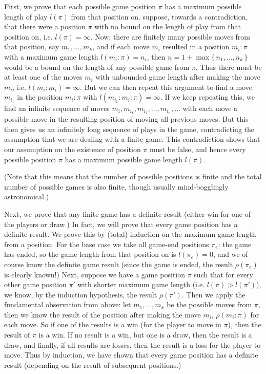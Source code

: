 \documentclass[10pt,dvipdfmx,letterpaper]{report}
\begin{document}
First, we prove that each possible game position $\pi$ has a maximum
possible length of play $l(\pi)$ from that position on.
suppose, towards a contradiction, that there were a position $\pi$ with no bound on the length
of play from that position on, {i.e.} $l(\pi)=\infty$.  Now, there are finitely many possible moves
from that position, say $m_1, \dots, m_k$, and if each move $m_i$ resulted
in a position $m_i:\pi$ with a maximum game length $l(m_i:\pi)=n_i$,
then $n=1+\max\{\,n_1,\dots,n_k\,\}$ would be a bound on the length of
any possible game from $\pi$.  Thus there must be at least one of the 
moves $m_i$ with unbounded game length after making the move $m_i$,
{i.e.} $l(m_i:m_i) = \infty$.
But we can then repeat this argument to find a move $m_{i_1}$ in the
position $m_i:\pi$ with $l(m_{i_1}:m_i:\pi)=\infty$.  If we keep repeating
this, we find an infinite sequence of moves
$m_i, m_{i_1}, m_{i_2}, \dots, m_{i_n}, \dots$ 
with each move a possible move in the resulting position of moving
all previous moves.  But this then gives us an infinitely long sequence of
plays in the game, contradicting the assumption that we are dealing with a finite game.
This contradiction shows that our assumption on the existence of position $\pi$ must be false,
and hence every possible position $\pi$ has a maximum possible game length $l(\pi)$.

(Note that this means that the number of possible
positions is finite and the total number of possible games is also finite, though
usually mind-bogglingly astronomical.)

Next, we prove that any finite game has a definite result
(either win for one of the players or draw.)  In fact, we will prove that every game
position has a definite result.  We prove this by (total) induction on the maximum game
length from a position.  For the base case we take all game-end positions $\pi_{e}$:
the game has ended, so the game length from that position on is $l(\pi_e)=0$, and we of course
know the definite game result (since the game is ended, the result $\rho(\pi_e)$ is clearly known!)
Next, suppose we have a game position $\pi$ such that for every other game position $\pi'$
with shorter maximum game length ({i.e.} $l(\pi)>l(\pi')$),
we know, by the induction hypothesis, the result $\rho(\pi')$.  Then we apply the fundamental
observation from above: let $m_1, \dots, m_k$ be the possible moves from $\pi$, then
we know the result of the position after making the move $m_i$, $\rho(m_i:\pi)$ for each move.
So if one of the results is a win (for the player to move in $\pi$), then the result of
$\pi$ is a win.  If no result is a win, but one is a draw, then the result is a draw,
and finally, if all results are losses, then the result is a loss for the player to move.
Thus by induction, we have shown that every game position has a definite result (depending on
the result of subsequent positions.)
\end{document}
